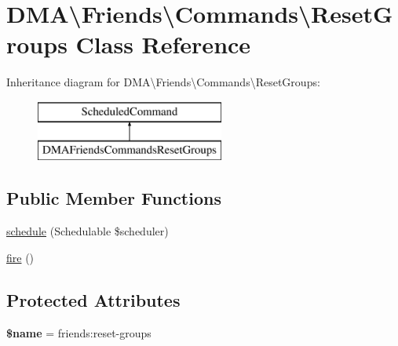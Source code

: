 \hypertarget{classDMA_1_1Friends_1_1Commands_1_1ResetGroups}{}\section{D\+M\+A\textbackslash{}Friends\textbackslash{}Commands\textbackslash{}Reset\+Groups Class Reference}
\label{classDMA_1_1Friends_1_1Commands_1_1ResetGroups}
Inheritance diagram for D\+M\+A\textbackslash{}Friends\textbackslash{}Commands\textbackslash{}Reset\+Groups\+:\begin{figure}[H]
\begin{center}
\leavevmode
\includegraphics[height=2.000000cm]{dc/d80/classDMA_1_1Friends_1_1Commands_1_1ResetGroups}
\end{center}
\end{figure}
\subsection*{Public Member Functions}
\begin{DoxyCompactItemize}
\item 
\hyperlink{classDMA_1_1Friends_1_1Commands_1_1ResetGroups_a39d5f7e4bd63574e523fb41a392b529e}{schedule} (Schedulable \$scheduler)
\item 
\hyperlink{classDMA_1_1Friends_1_1Commands_1_1ResetGroups_a1671243f4b929d299357d08490661732}{fire} ()
\end{DoxyCompactItemize}
\subsection*{Protected Attributes}
\begin{DoxyCompactItemize}
\item 
\hypertarget{classDMA_1_1Friends_1_1Commands_1_1ResetGroups_a713919df694ce18df9c2527e833dc858}{}{\bfseries \$name} = \textquotesingle{}friends\+:reset-\/groups\textquotesingle{}\label{classDMA_1_1Friends_1_1Commands_1_1ResetGroups_a713919df694ce18df9c2527e833dc858}

\end{DoxyCompactItemize}


